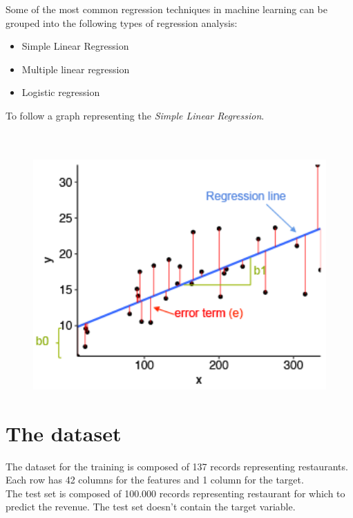 \documentclass[a4paper,10pt]{report}
\begin{document}
Some of the most common regression techniques in machine learning can be grouped into the following types of regression analysis: 
\begin{itemize}
\item Simple Linear Regression 
\item Multiple linear regression 
\item Logistic regression 
\end{itemize}
To follow a graph representing the \emph{Simple Linear Regression}.
\\
\\
\\
\begin{figure}[H]
    \includegraphics[width = 350pt]{img/linear-regression.png}
  \end{figure} 
\chapter{The dataset}
The dataset for the training is composed of 137 records representing restaurants.\\
Each row has 42 columns for the features and 1 column for the target.\\
The test set is composed of 100.000 records representing restaurant for which to predict the revenue. The test set doesn't contain the target variable.\\
\end{document}
